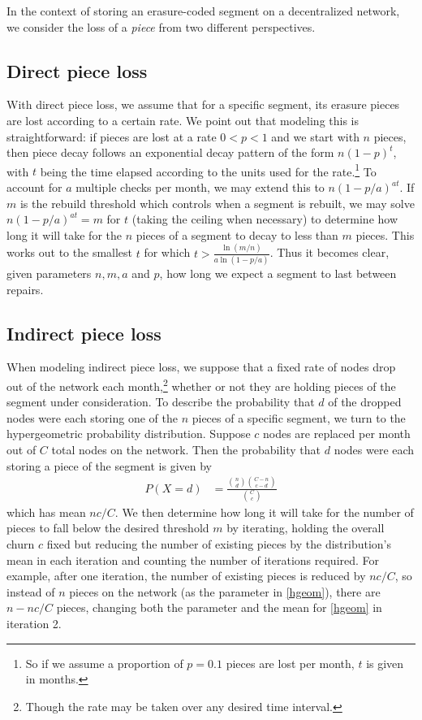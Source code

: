 In the context of storing an erasure-coded segment on a decentralized network, we consider the loss of a {\em piece} from two different perspectives.

\subsection{Direct piece loss}
With direct piece loss, we assume that for a specific segment, its erasure pieces are lost according to a certain rate. We point out that modeling this is straightforward: if pieces are lost at a rate $0<p<1$ and we start with $n$ pieces, then piece decay follows an exponential decay pattern of the form $n(1-p)^t$, with $t$ being the time elapsed according to the units used for the rate.\footnote{So if we assume a proportion of $p=0.1$ pieces are lost per month, $t$ is given in months.}
To account for $a$ multiple checks per month, we may extend this to $n(1-p/a)^{at}$. If $m$ is the rebuild threshold which controls when a segment is rebuilt, we may solve $n(1-p/a)^{at}=m$ for $t$ (taking the ceiling when necessary) to determine how long it will take for the $n$ pieces of a segment to decay to less than $m$ pieces. This works out to the smallest $t$ for which
$t>\frac{\ln(m/n)}{a\ln(1-p/a)}$. Thus it becomes clear, given parameters $n,m,a$ and $p$, how long we expect a segment to last between repairs.

\subsection{Indirect piece loss}

When modeling indirect piece loss, we suppose that a fixed rate of nodes
drop out of the network each month,\footnote{Though the rate may be taken over
any desired time interval.} whether or not they are holding pieces of the segment
under consideration. To describe the probability that $d$ of the dropped nodes
were each storing one of the $n$ pieces of a specific segment, we turn to the
hypergeometric probability distribution. Suppose $c$ nodes are replaced per
month out of $C$ total nodes on the network. Then the probability that $d$
nodes were each storing a piece of the segment is given by
\begin{align}
&&    P(X=d)&=\frac{\binom{n}{d}\binom{C-n}{c-d}}{\binom{C}{c}}\label{hgeom} &&
\end{align}
which has mean $nc/C$. We then determine how long it will take for the number of pieces to fall below the desired threshold $m$ by iterating, holding the overall churn $c$ fixed but reducing the number of existing pieces by the distribution's mean in each iteration and counting the number of iterations required. For example, after one iteration, the number of existing pieces is reduced by $nc/C$, so instead of $n$ pieces on the network (as the parameter in \eqref{hgeom}), there are $n-nc/C$ pieces, changing both the parameter and the mean for \eqref{hgeom} in iteration 2.

